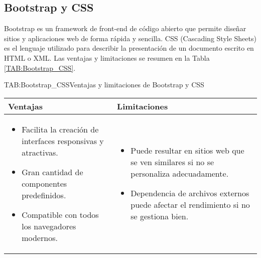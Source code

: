 \subsection{Bootstrap y CSS}

Bootstrap es un framework de front-end de código abierto que permite diseñar sitios y aplicaciones web de forma rápida y sencilla. CSS (Cascading Style Sheets) es el lenguaje utilizado para describir la presentación de un documento escrito en HTML o XML. Las ventajas y limitaciones se resumen en la Tabla \ref{TAB:Bootstrap_CSS}.

\begin{table}[Bootstrap y CSS]{TAB:Bootstrap_CSS}{Ventajas y limitaciones de Bootstrap y CSS}
  \begin{tabular}{|p{7cm}|p{7cm}|}
    \hline
    \textbf{Ventajas} & \textbf{Limitaciones} \\
    \hline
    \begin{itemize}
      \item Facilita la creación de interfaces responsivas y atractivas.
      \item Gran cantidad de componentes predefinidos.
      \item Compatible con todos los navegadores modernos.
    \end{itemize} &
    \begin{itemize}
      \item Puede resultar en sitios web que se ven similares si no se personaliza adecuadamente.
      \item Dependencia de archivos externos puede afectar el rendimiento si no se gestiona bien.
    \end{itemize} \\
    \hline
  \end{tabular}
\end{table}
